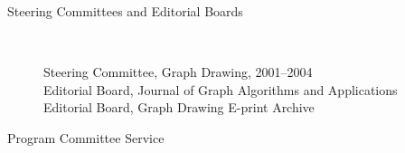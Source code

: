 \documentclass[10pt]{article}
\begin{document}
\begin{description}










\item [Steering Committees and Editorial Boards]\

Steering Committee, Graph Drawing, 2001--2004\\
Editorial Board, Journal of Graph Algorithms and Applications\\
Editorial Board, Graph Drawing E-print Archive

\vspace{0cm}\item [Program Committee Service]\


\end{description}
\end{document}
